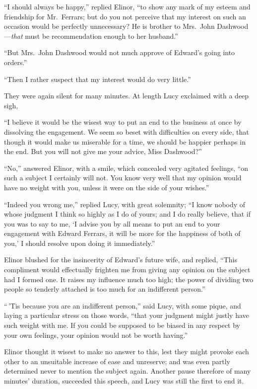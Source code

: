 \documentclass{article}
\begin{document}
``I should always be happy,'' replied Elinor, ``to show
any mark of my esteem and friendship for Mr.\ Ferrars;
but do you not perceive that my interest on such an
occasion would be perfectly unnecessary?  He is brother
to Mrs.\ John Dashwood---\emph{that} must be recommendation enough
to her husband.''

``But Mrs.\ John Dashwood would not much approve
of Edward's going into orders.''

``Then I rather suspect that my interest would
do very little.''

They were again silent for many minutes.  At length
Lucy exclaimed with a deep sigh,

``I believe it would be the wisest way to put an end
to the business at once by dissolving the engagement.
We seem so beset with difficulties on every side,
that though it would make us miserable for a time,
we should be happier perhaps in the end.  But you will
not give me your advice, Miss Dashwood?''

``No,'' answered Elinor, with a smile, which concealed
very agitated feelings, ``on such a subject I certainly
will not.  You know very well that my opinion would have
no weight with you, unless it were on the side of your wishes.''

``Indeed you wrong me,'' replied Lucy, with great
solemnity; ``I know nobody of whose judgment I think
so highly as I do of yours; and I do really believe,
that if you was to say to me, `I advise you by all means
to put an end to your engagement with Edward Ferrars,
it will be more for the happiness of both of you,'
I should resolve upon doing it immediately.''

Elinor blushed for the insincerity of Edward's
future wife, and replied, ``This compliment would effectually
frighten me from giving any opinion on the subject
had I formed one.  It raises my influence much too high;
the power of dividing two people so tenderly attached
is too much for an indifferent person.''

``\,'Tis because you are an indifferent person,'' said Lucy,
with some pique, and laying a particular stress on those words,
``that your judgment might justly have such weight with me.
If you could be supposed to be biased in any respect
by your own feelings, your opinion would not be worth having.''

Elinor thought it wisest to make no answer to this,
lest they might provoke each other to an unsuitable increase
of ease and unreserve; and was even partly determined
never to mention the subject again.  Another pause
therefore of many minutes' duration, succeeded this speech,
and Lucy was still the first to end it.
\end{document}
